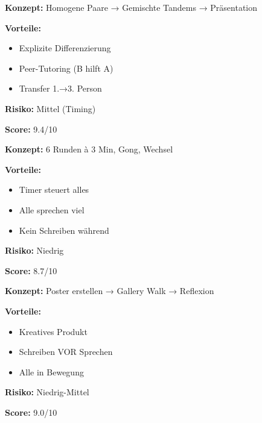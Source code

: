\documentclass[11pt, a4paper]{article}
\begin{document}
\begin{minipage}[t]{0.32\textwidth}
\begin{tcolorbox}[
    colback=varianteA!10,
    colframe=varianteA,
    title={\footnotesize\bfseries A: Tandem-Interview},
    fonttitle=\bfseries\color{white},
    colbacktitle=varianteA,
    boxrule=0.8pt,
    top=2pt, bottom=2pt, left=4pt, right=4pt
]
\footnotesize
\textbf{Konzept:} Homogene Paare → Gemischte Tandems → Präsentation

\textbf{Vorteile:}
\begin{itemize}
\item Explizite Differenzierung
\item Peer-Tutoring (B hilft A)
\item Transfer 1.→3. Person
\end{itemize}

\textbf{Risiko:} Mittel (Timing)

\textbf{Score:} 9.4/10
\end{tcolorbox}
\end{minipage}
\hfill
\begin{minipage}[t]{0.32\textwidth}
\begin{tcolorbox}[
    colback=varianteB!10,
    colframe=varianteB,
    title={\footnotesize\bfseries B: Speed-Dating},
    fonttitle=\bfseries\color{white},
    colbacktitle=varianteB,
    boxrule=0.8pt,
    top=2pt, bottom=2pt, left=4pt, right=4pt
]
\footnotesize
\textbf{Konzept:} 6 Runden à 3 Min, Gong, Wechsel

\textbf{Vorteile:}
\begin{itemize}
\item Timer steuert alles
\item Alle sprechen viel
\item Kein Schreiben während
\end{itemize}

\textbf{Risiko:} Niedrig

\textbf{Score:} 8.7/10
\end{tcolorbox}
\end{minipage}
\hfill
\begin{minipage}[t]{0.32\textwidth}
\begin{tcolorbox}[
    colback=varianteC!10,
    colframe=varianteC,
    title={\footnotesize\bfseries C: Galerierundgang},
    fonttitle=\bfseries\color{white},
    colbacktitle=varianteC,
    boxrule=0.8pt,
    top=2pt, bottom=2pt, left=4pt, right=4pt
]
\footnotesize
\textbf{Konzept:} Poster erstellen → Gallery Walk → Reflexion

\textbf{Vorteile:}
\begin{itemize}
\item Kreatives Produkt
\item Schreiben VOR Sprechen
\item Alle in Bewegung
\end{itemize}

\textbf{Risiko:} Niedrig-Mittel

\textbf{Score:} 9.0/10
\end{tcolorbox}
\end{minipage}
\end{document}
